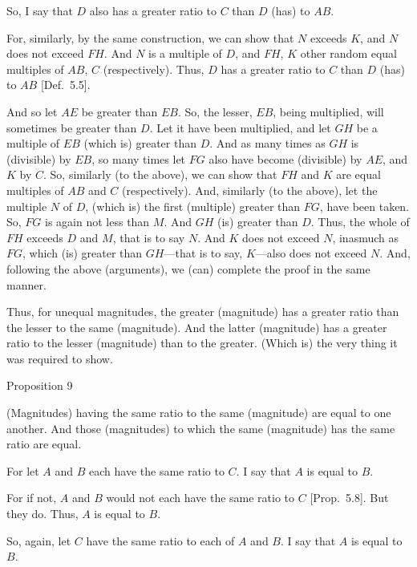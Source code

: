 So, I say that $D$ also has a greater ratio to $C$ than $D$ (has) to $AB$.

For, similarly, by the same construction, we can show that 
$N$ exceeds $K$, and $N$ does not exceed $FH$. And $N$ is a multiple of $D$,
and $FH$, $K$ other  random  equal multiples of $AB$, $C$ (respectively). Thus, $D$ has a greater
ratio to  $C$ than $D$ (has) to $AB$ [Def.~5.5].

And so let $AE$ be greater than $EB$. So, the lesser, $EB$, being multiplied, will
sometimes be greater than $D$. Let it have been multiplied, and let $GH$ be
a multiple of $EB$ (which is) greater than $D$. And as many times as $GH$ is
(divisible) by $EB$, so many times let $FG$ also have become (divisible) by $AE$,
and $K$ by $C$. So, similarly (to the above), we can show that $FH$ and $K$ are equal multiples of
$AB$ and $C$ (respectively). And, similarly (to the above), let the multiple $N$ of $D$,  (which is)
the first (multiple) greater than $FG$, have been taken. So,  $FG$ is again not less than $M$.
And $GH$ (is) greater than $D$. Thus, the whole of $FH$ exceeds $D$ and $M$, that is to say $N$.  And $K$ does not exceed $N$, inasmuch as $FG$, which (is) greater than
$GH$---that is to say, $K$---also does not exceed $N$. And, following the above (arguments), we  (can) complete the proof in the same manner.

Thus, for unequal magnitudes, the greater (magnitude) has a greater
ratio  than the lesser to the same (magnitude). And the latter (magnitude)
has a greater ratio to the lesser (magnitude) than to the greater. (Which is)
the very thing it was required to show.


\begin{center}
{\large Proposition 9}
\end{center}

(Magnitudes) having the same ratio to the same (magnitude) are equal to one another. And those (magnitudes) to which the same (magnitude)
has the same ratio are equal.

\epsfysize=0.5in
\centerline{}

For let $A$ and $B$ each have the same ratio to $C$. I say that $A$ is equal to $B$.

For if not, $A$ and $B$ would not each have the same ratio to $C$ [Prop.~5.8].
But they do. Thus, $A$ is equal to $B$.

So, again, let $C$ have the same ratio to each of $A$ and $B$. I say that $A$ is equal to $B$.

